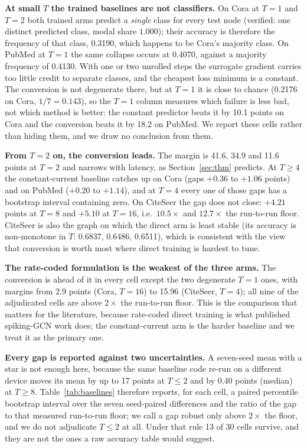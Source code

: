 \documentclass[10pt,twocolumn]{article}
\newcommand{\tabref}[1]{Table~\ref{#1}}
\newcommand{\secref}[1]{Section~\ref{#1}}
\begin{document}
\textbf{At small $T$ the trained baselines are not classifiers.} On Cora at $T=1$ and $T=2$ both
trained arms predict a \emph{single} class for every test node (verified: one distinct predicted
class, modal share $1.000$); their accuracy is therefore the frequency of that class, 0.3190, which
happens to be Cora's majority class. On PubMed at $T=1$ the same collapse occurs at 0.4070, against
a majority frequency of 0.4130. With one or two unrolled steps the surrogate gradient carries too
little credit to separate classes, and the cheapest loss minimum is a constant. The conversion is
not degenerate there, but at $T=1$ it is close to chance (0.2176 on Cora, $1/7 = 0.143$), so the
$T=1$ column measures which failure is less bad, not which method is better: the constant predictor
beats it by 10.1 points on Cora and the conversion beats it by 18.2 on PubMed. We report these cells
rather than hiding them, and we draw no conclusion from them.

\textbf{From $T=2$ on, the conversion leads.} The margin is 41.6, 34.9 and 11.6 points at $T=2$ and
narrows with latency, as \secref{sec:thm} predicts. At $T \ge 4$ the constant-current baseline
catches up on Cora (gaps $+0.36$ to $+1.06$ points) and on PubMed ($+0.20$ to $+1.14$), and at
$T=4$ every one of those gaps has a bootstrap interval containing zero. On CiteSeer the gap does not
close: $+4.21$ points at $T=8$ and $+5.10$ at $T=16$, i.e.\ $10.5\times$ and $12.7\times$ the
run-to-run floor. CiteSeer is also the graph on which the direct arm is least stable (its accuracy
is non-monotone in $T$: 0.6837, 0.6486, 0.6511), which is consistent with the view that conversion
is worth most where direct training is hardest to tune.

\textbf{The rate-coded formulation is the weakest of the three arms.} The conversion is ahead of it
in every cell except the two degenerate $T=1$ ones, with margins from 2.9 points (Cora, $T=16$) to
15.96 (CiteSeer, $T=4$); all nine of the adjudicated cells are above $2\times$ the run-to-run floor.
This is the
comparison that matters for the literature, because rate-coded direct training is what published
spiking-GCN work does; the constant-current arm is the harder baseline and we treat it as the
primary one.

\textbf{Every gap is reported against two uncertainties.} A seven-seed mean with a star is not enough
here, because the same baseline code re-run on a different device moves its mean by up to 17 points
at $T \le 2$ and by 0.40 points (median) at $T \ge 8$. \tabref{tab:baselines} therefore reports, for
each cell, a paired percentile bootstrap interval over the seven seed-paired differences and the
ratio of the gap to that measured run-to-run floor; we call a gap robust only above
$2\times$ the floor, and we do not adjudicate $T \le 2$ at all. Under that rule 13 of 30 cells
survive, and they are not the ones a raw accuracy table would suggest.
\end{document}
